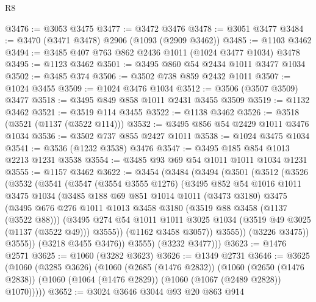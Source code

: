 \begin{lexlean}{R8}
\begin{coremodule}
@3476 := @3053 @3475
@3477 := @3472 @3476
@3478 := @3051 @3477
@3484 := @3470 (@3471 @3478) @2906 (@1093 (@2909 @3462))
@3485 := @1103 @3462
@3494 := @3485 @407 @763 @862 @2436 @1011 (@1024 @3477 @1034) @3478
@3495 := @1123 @3462
@3501 := @3495 @860 @54 @2434 @1011 @3477 @1034
@3502 := @3485 @374
@3506 := @3502 @738 @859 @2432 @1011
@3507 := @1024 @3455
@3509 := @1024 @3476 @1034
@3512 := @3506 (@3507 @3509) @3477
@3518 := @3495 @849 @858 @1011 @2431 @3455 @3509
@3519 := @1132 @3462
@3521 := @3519 @114 @3455
@3522 := @1138 @3462
@3526 := @3518 (@3521 (@1137 (@3522 @114)))
@3532 := @3495 @856 @54 @2429 @1011 @3476 @1034
@3536 := @3502 @737 @855 @2427 @1011
@3538 := @1024 @3475 @1034
@3541 := @3536 (@1232 @3538) @3476
@3547 := @3495 @185 @854 @1013 @2213 @1231 @3538
@3554 := @3485 @93 @69 @54 @1011 @1011 @1034 @1231
@3555 := @1157 @3462
@3622 := @3454
    (@3484
      (@3494
        (@3501
          (@3512
            (@3526
              (@3532
                (@3541
                  (@3547
                    (@3554 @3555 @1276)
                    (@3495
                      @852
                      @54
                      @1016
                      @1011
                      @3475
                      @1034
                      (@3485
                        @188
                        @69
                        @851
                        @1014
                        @1011
                        (@3473 @3180)
                        @3475
                        (@3495
                          @676
                          @276
                          @1011
                          @1013
                          @3458
                          @3180
                          (@3519 @88 @3458 (@1137 (@3522 @88)))
                          (@3495
                            @274
                            @54
                            @1011
                            @1011
                            @3025
                            @1034
                            (@3519 @49 @3025 (@1137 (@3522 @49)))
                            @3555))
                        (@1162 @3458 @3057))
                      @3555))
                  (@3226 @3475))
                @3555))
            (@3218 @3455 @3476))
          @3555)
        (@3232 @3477)))
@3623 := @1476 @2571
@3625 := @1060 (@3282 @3623)
@3626 := @1349 @2731
@3646 := @3625
    (@1060
      (@3285 @3626)
      (@1060
        (@2685 (@1476 @2832))
        (@1060
          (@2650 (@1476 @2838))
          (@1060 (@1064 (@1476 @2829)) (@1060 (@1067 (@2489 @2828)) @1070)))))
@3652 := @3024 @3646 @3044 @93 @20 @863 @914

\end{coremodule}
\end{lexlean}
